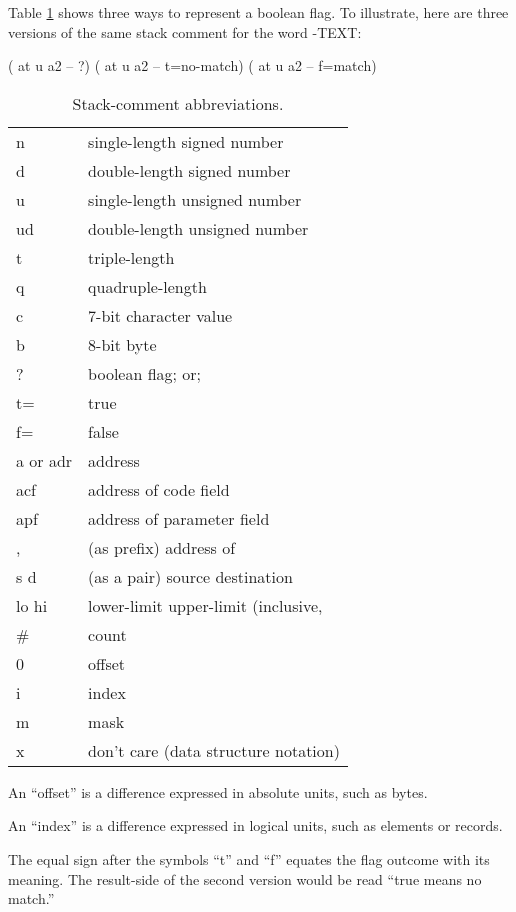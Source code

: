 Table \ref{tab-5-2} shows three ways to represent a boolean flag.  To
illustrate, here are three versions of the same stack comment for the
word -TEXT:
\begin{Code}
( at u a2 -- ?)
( at u a2 -- t=no-match)
( at u a2 -- f=match)
\end{Code}
\begin{table}[tttt]
\caption{Stack-comment abbreviations.}
\label{tab-5-2}
\vspace{1ex}
\blackline{1ex}
\begin{tabular}{@{\hspace{2.5em}}ll}
n             &  single-length signed number \\
d             &  double-length signed number \\
u             &  single-length unsigned number \\
ud            &  double-length unsigned number \\
t             &  triple-length \\
q             &  quadruple-length \\
c             &  7-bit character value \\
b             &  8-bit byte \\
?             &  boolean flag; or; \\
\quad t=         &  true \\
\quad f=         &  false \\
a or adr      &  address \\
acf           &  address of code field \\
apf           &  address of parameter field \\
,             &  (as prefix) address of \\
s d           &  (as a pair) source destination \\
lo hi         &  lower-limit upper-limit (inclusive, \\
\#            &   count \\
0             &  offset \\
i             &  index \\
m             &  mask \\
x             &  don't care (data structure notation) \\
\end{tabular}
\bigskip

An ``offset'' is a difference expressed in absolute units, such as bytes.

An ``index'' is a difference expressed in logical units, such as elements or records.
\vspace{0ex}
\blackline{0ex}
\end{table}
The equal sign after the symbols ``t'' and ``f'' equates the flag outcome
with its meaning.  The result-side of the second version would be read
``true means no match.''

